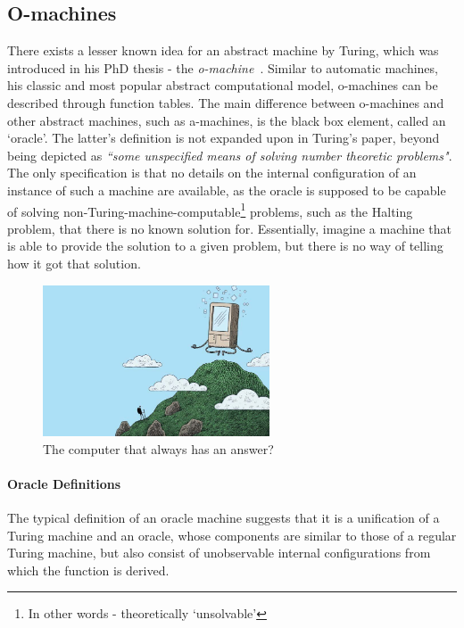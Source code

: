 \documentclass[12pt]{article}
\begin{document}
		\newpage\subsection{O-machines}
			There exists a lesser known idea for an abstract machine by Turing, which was introduced in his PhD thesis - the \textit{o-machine}~\cite{Turing1938}. Similar to automatic machines, his classic and most popular abstract computational model, o-machines can be described through function tables. The main difference between o-machines and other abstract machines, such as a-machines, is the black box element, called an `oracle'. The latter's definition is not expanded upon in Turing's paper, beyond being depicted as \textit{``some unspecified means of solving number theoretic problems"}. The only specification is that no details on the internal configuration of an instance of such a machine are available, as the oracle is supposed to be capable of solving non-Turing-machine-computable\footnote{In other words - theoretically `unsolvable'} problems, such as the Halting problem, that there is no known solution for. Essentially, imagine a machine that is able to provide the solution to a given problem, but there is no way of telling how it got that solution.\\
			
			\begin{figure}[h!]
				\centering
				\includegraphics[width=0.6\textwidth]{art}
				\caption{The computer that always has an answer?~\cite{newscientist_2014}}
			\end{figure}	

			\paragraph{Oracle Definitions}
				The typical definition of an oracle machine suggests that it is a unification of a Turing machine and an oracle, whose components are similar to those of a regular Turing machine, but also consist of unobservable internal configurations from which the function is derived. 
				
\end{document}
